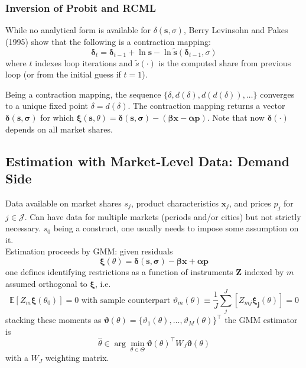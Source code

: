 \documentclass[11pt]{article}
\begin{document}
\subsubsection{Inversion of Probit and RCML}

While no analytical form is available for $\delta(\bm{s}, \sigma)$, Berry Levinsohn and Pakes (1995) show that the following is a contraction mapping:
\begin{equation}
	\bm{\delta}_{t} = \bm{\delta}_{t-1} + \ln \bm{s} - \ln \bm{\tilde{s}}(\bm{\delta}_{t-1}, \sigma)
\end{equation}
where $t$ indexes loop iterations and $\tilde{s}(\cdot)$ is the computed share from previous loop (or from the initial guess if $t=1$).

Being a contraction mapping, the sequence $\{\delta, d(\delta), d(d(\delta)), \dots\}$ converges to a unique fixed point $\delta = d(\delta)$.
The contraction mapping returns a vector $\bm{\delta}(\bm{s}, \bm{\sigma})$ for which $\bm{\xi}(\bm{s}, \theta) = \bm{\delta}(\bm{s}, \bm{\sigma}) - (\bm{\beta} \bm{x} - \bm{\alpha} \bm{p})$.
Note that now $\bm{\delta}(\cdot)$ depends on all market shares.

\subsection{Estimation with Market-Level Data: Demand Side}

Data available on market shares $s_j$, product characteristics $\bm{x}_j$, and prices $p_j$ for $j \in \mathscr{J}$. Can have data for multiple markets (periods and/or cities) but not strictly necessary. $s_0$ being a construct, one usually needs to impose some assumption on it. \\

Estimation proceeds by GMM: given residuals
\begin{equation}
	\bm{\xi}(\theta) = \bm{\delta}(\bm{s}, \bm{\sigma}) - \bm{\beta}\bm{x} + \bm{\alpha p}
\end{equation}
one defines identifying restrictions as a function of instruments $\bm{Z}$ indexed by $m$ assumed orthogonal to $\bm{\xi}$, i.e.
\begin{equation}
	\mathbb{E}[Z_m\bm{\xi}(\theta_0)] = 0 \text{ with sample counterpart } \vartheta_m(\theta) \equiv \frac{1}{J}\sum_j^J[Z_{mj}\bm{\xi_j}(\theta)] = 0
\end{equation}
stacking these moments as $\bm{\vartheta}(\theta) = \{\vartheta_1(\theta), \dots, \vartheta_M(\theta)\}^\intercal$ the GMM estimator is
\begin{equation}
	\hat{\theta} \in \arg \min_{\theta \in \Theta} \bm{\vartheta}(\theta)^\intercal W_J \bm{\vartheta}(\theta)
\end{equation}
with a $W_J$ weighting matrix.
\end{document}
